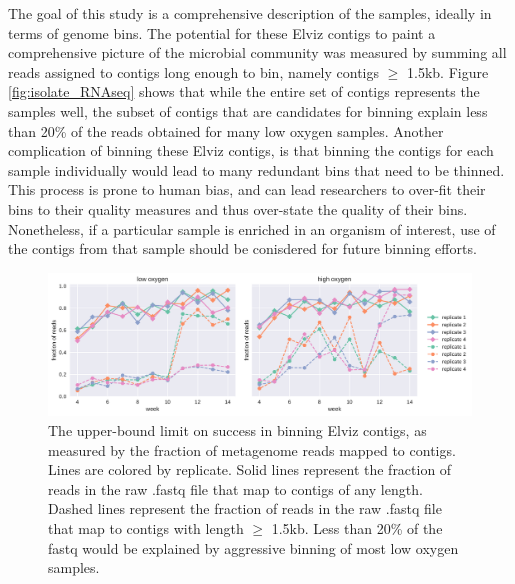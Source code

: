 The goal of this study is a comprehensive description of the samples, ideally in terms of genome bins.
The potential for these Elviz contigs to paint a comprehensive picture of the microbial community was measured by summing all reads assigned to contigs long enough to bin, namely contigs $\geq$ 1.5kb.
Figure \ref{fig:isolate_RNAseq} shows that while the entire set of contigs represents the samples well, the subset of contigs that are candidates for binning explain less than 20\% of the reads obtained for many low oxygen samples.
Another complication of binning these Elviz contigs, is that binning the contigs for each sample individually would lead to many redundant bins that need to be thinned.
This process is prone to human bias, and can lead researchers to over-fit their bins to their quality measures and thus over-state the quality of their bins.
Nonetheless, if a particular sample is enriched in an organism of interest, use of the contigs from that sample should be conisdered for future binning efforts.


\begin{figure}[H]
\centering
    \includegraphics[width=1.0\textwidth]{./tex/chapter2/figures/170314_Elviz_is_not_for_binning--landscape.pdf}  %
    \begin{singlespace}
    \caption[Upper-bound limit on success of binning Elviz contigs]{
        The upper-bound limit on success in binning Elviz contigs, as measured by the fraction of metagenome reads mapped to contigs.
        Lines are colored by replicate.
        Solid lines represent the fraction of reads in the raw .fastq file that map to contigs of any length.
        Dashed lines represent the fraction of reads in the raw .fastq file that map to contigs with length $\geq$ 1.5kb.
        Less than 20\% of the fastq would be explained by aggressive binning of most low oxygen samples.}
    \label{fig:dont_bin_Elviz}
    \end{singlespace}
\end{figure}

